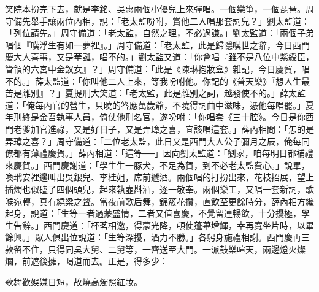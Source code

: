笑院本扮完下去，就是李銘、吳惠兩個小優兒上來彈唱。一個欒箏，一個琵琶。周守備先舉手讓兩位內相，說：「老太監吩咐，賞他二人唱那套詞兒？」劉太監道：「列位請先。」周守備道：「老太監，自然之理，不必過謙。」劉太監道：「兩個子弟唱個『嘆浮生有如一夢裡』。」周守備道：「老太監，此是歸隱嘆世之辭，今日西門慶大人喜事，又是華誕，唱不的。」劉太監又道：「你會唱『雖不是八位中紫綬臣，管領的六宮中金釵女』？」周守備道：「此是《陳琳抱妝盒》雜記，今日慶賀，唱不的。」薛太監道：「你叫他二人上來，等我吩咐他。你記的《普天樂》『想人生最苦是離別』？」夏提刑大笑道：「老太監，此是離別之詞，越發使不的。」薛太監道：「俺每內官的營生，只曉的答應萬歲爺，不曉得詞曲中滋味，憑他每唱罷。」夏年刑終是金吾執事人員，倚仗他刑名官，遂吩咐：「你唱套《三十腔》。今日是你西門老爹加官進祿，又是好日子，又是弄璋之喜，宜該唱這套。」薛內相問：「怎的是弄璋之喜？」周守備道：「二位老太監，此日又是西門大人公子彌月之辰，俺每同僚都有薄禮慶賀。」薛內相道：「這等──」因向劉太監道：「劉家，咱每明日都補禮來慶賀。」西門慶謝道：「學生生一豚犬，不足為賀，到不必老太監費心。」說畢，喚玳安裡邊叫出吳銀兒、李桂姐，席前遞酒。兩個唱的打扮出來，花枝招展，望上插燭也似磕了四個頭兒，起來執壺斟酒，逐一敬奉。兩個樂工，又唱一套新詞，歌喉宛轉，真有繞梁之聲。當夜前歌后舞，錦簇花攢，直飲至更餘時分，薛內相方纔起身，說道：「生等一者過蒙盛情，二者又值喜慶，不覺留連暢飲，十分擾極，學生告辭。」西門慶道：「杯茗相邀，得蒙光降，頓使蓬蓽增輝，幸再寬坐片時，以畢餘興。」眾人俱出位說道：「生等深擾，酒力不勝。」各躬身施禮相謝。西門慶再三款留不住，只得同吳大舅、二舅等，一齊送至大門。一派鼓樂喧天，兩邊燈火燦爛，前遮後擁，喝道而去。正是，得多少：

歌舞歡娛嫌日短，故燒高燭照紅妝。


